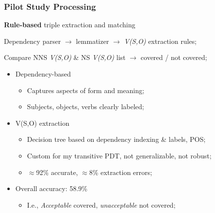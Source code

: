 \documentclass[handout,xcolor={dvipsnames}]{beamer}
\begin{document}
\begin{frame}
\frametitle{Pilot Study Processing}
\textbf{Rule-based} triple extraction and matching

\medskip
\pause
Dependency parser $\rightarrow$ lemmatizer $\rightarrow$ \textit{V(S,O)} extraction rules;

\pause
\medskip
Compare NNS \textit{V(S,O)} \& NS \textit{V(S,O)} list $\rightarrow$ covered / not covered;
\pause

\begin{itemize}
\pause
\item Dependency-based
\begin{itemize}
\pause
\item Captures aspects of form and meaning;
\pause
\item Subjects, objects, verbs clearly labeled;
\end{itemize}
\pause
\item V(S,O) extraction
\begin{itemize}
\pause
\item Decision tree based on dependency indexing \& labels, POS;
\pause
\item Custom for my transitive PDT, not generalizable, not robust;
\pause
\item $\approx$92\% accurate, $\approx$8\% extraction errors;
\end{itemize}
\pause
\item Overall accuracy: 58.9\%
\pause
\begin{itemize}
\pause
\item I.e., \textit{Acceptable} covered, \textit{unacceptable} not covered;
\end{itemize}
\end{itemize}
\end{frame}
\end{document}
